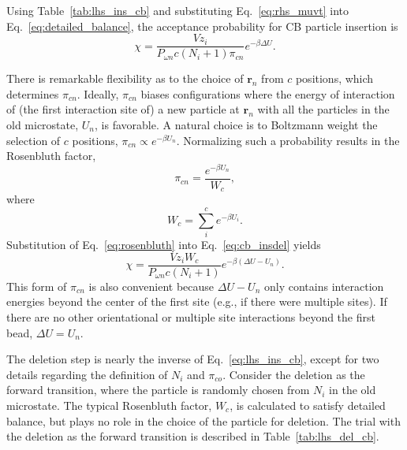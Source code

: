 \documentclass[
  9pt,
  bestpractices,
]{livecoms}
\begin{document}
Using Table~\ref{tab:lhs_ins_cb} and substituting Eq.~\ref{eq:rhs_muvt} into Eq.~\ref{eq:detailed_balance}, the acceptance probability for CB particle insertion is
\begin{equation}
\chi = \frac{Vz_i}{P_{\omega n}{c}(N_i+1)\pi_{cn}}e^{-\beta\Delta U}.
\label{eq:cb_insdel}
\end{equation}

There is remarkable flexibility as to the choice of $\mathbf{r}_n$ from $c$ positions, which determines $\pi_{cn}$.
Ideally, $\pi_{cn}$ biases configurations where the energy of interaction of (the first interaction site of) a new particle at $\mathbf{r}_n$ with all the particles in the old microstate, $U_n$, is favorable.
A natural choice is to Boltzmann weight the selection of $c$ positions, $\pi_{cn} \propto e^{-\beta U_n}$.
Normalizing such a probability results in the Rosenbluth factor,
\begin{equation}
\pi_{cn} = \frac{e^{-\beta U_n}}{W_{c}},
\label{eq:rosenbluth}
\end{equation}
where
\begin{equation}
W_{c}=\sum_{i}^{c} e^{-\beta U_i}.
\label{eq:wc}
\end{equation}
Substitution of Eq.~\ref{eq:rosenbluth} into Eq.~\ref{eq:cb_insdel} yields
\begin{equation}
\chi = \frac{Vz_i W_{c}}{P_{\omega n}{c}(N_i+1)}e^{-\beta(\Delta U - U_n)}.
\label{eq:lhs_ins_cb}
\end{equation}
This form of $\pi_{cn}$ is also convenient because $\Delta U - U_n$ only contains interaction energies beyond the center of the first site (e.g., if there were multiple sites).
If there are no other orientational or multiple site interactions beyond the first bead, $\Delta U = U_n$.

The deletion step is nearly the inverse of Eq.~\ref{eq:lhs_ins_cb}, except for two details regarding the definition of $N_i$ and $\pi_{co}$.
Consider the deletion as the forward transition, where the particle is randomly chosen from $N_i$ in the old microstate.
The typical Rosenbluth factor, $W_{c}$, is calculated to satisfy detailed balance, but plays no role in the choice of the particle for deletion.
The trial with the deletion as the forward transition is described in Table~\ref{tab:lhs_del_cb}.
\end{document}
